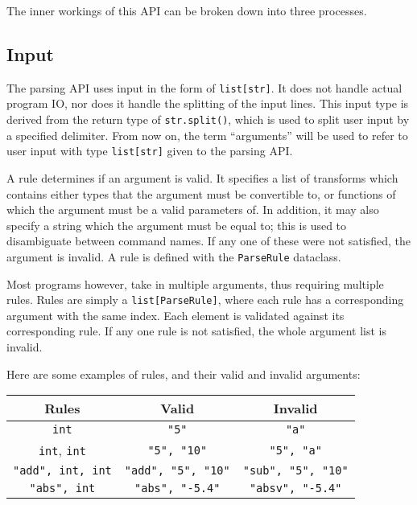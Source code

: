 \documentclass{article}
\begin{document}
		The inner workings of this API can be broken down into three processes.

		\subsection{Input}
			The parsing API uses input in the form of \verb|list[str]|. It does not handle
			actual program IO, nor does it handle the splitting of the input lines. This
			input type is derived from the return type of \verb|str.split()|, which is
			used to split user input by a specified delimiter. From now on, the term
			``arguments'' will be used to refer to user input with type \verb|list[str]|
			given to the parsing API\@.

			A rule determines if an argument is valid. It specifies a list of transforms which
			contains either types that the argument must be convertible to, or functions of
			which the argument must be a valid parameters of. In addition, it may also specify
			a string which the argument must be equal to; this is used to disambiguate between
			command names. If any one of these were not satisfied, the argument is invalid. A
			rule is defined with the \verb|ParseRule| dataclass.

			Most programs however, take in multiple arguments, thus requiring multiple rules.
			Rules are simply a \verb|list[ParseRule]|, where each rule has a corresponding
			argument with the same index. Each element is validated against its corresponding
			rule. If any one rule is not satisfied, the whole argument list is invalid.

			Here are some examples of rules, and their valid and invalid arguments:

			\begin{center}
				\begin{tabular}{|c|c|c|}
					\hline
					Rules & Valid & Invalid
					\\ \hline
						\verb|int| &
						\verb|"5"| &
						\verb|"a"|
					\\ \hline
						\verb|int|, \verb|int| &
						\verb|"5", "10"| &
						\verb|"5", "a"|
					\\ \hline
						\verb|"add", int, int| &
						\verb|"add", "5", "10"| &
						\verb|"sub", "5", "10"|
					\\ \hline
						\verb|"abs", int| &
						\verb|"abs", "-5.4"| &
						\verb|"absv", "-5.4"|
					\\\hline
				\end{tabular}
			\end{center}
\end{document}
